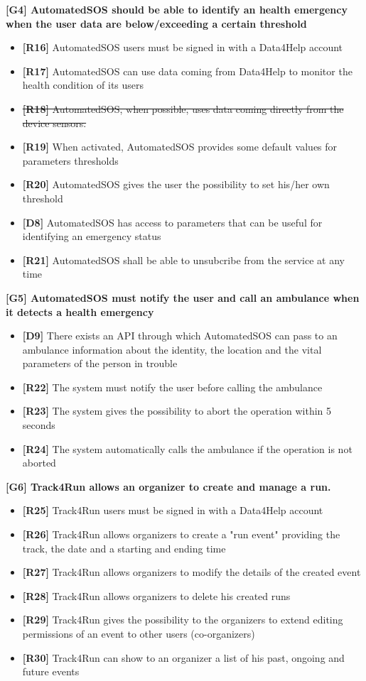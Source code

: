 \textbf{[G4] AutomatedSOS should be able to identify an health emergency when the user data are below/exceeding a certain threshold}
\begin{itemize}
	\item \textbf{[R16]} AutomatedSOS users must be signed in with a Data4Help account
	\item \textbf{[R17]} AutomatedSOS can use data coming from Data4Help to monitor the health condition of its users
	\item \sout{\textbf{[R18]} AutomatedSOS, when possible, uses data coming directly from the device sensors.}
	\item \textbf{[R19]} When activated, AutomatedSOS provides some default values for parameters thresholds
	\item \textbf{[R20]} AutomatedSOS gives the user the possibility to set his/her own threshold 
	\item \textbf{[D8]} AutomatedSOS has access to parameters that can be useful for identifying an emergency status
	\item \textbf{[R21]} AutomatedSOS shall be able to unsubcribe from the service at any time
\end{itemize}

\textbf{[G5] AutomatedSOS must notify the user and call an ambulance when it detects a health emergency}
\begin{itemize}
	\item \textbf{[D9]} There exists an API through which AutomatedSOS can pass to an ambulance information about the identity, the location and the vital parameters of the person in trouble
	\item \textbf{[R22]} The system must notify the user before calling the ambulance
	\item \textbf{[R23]} The system gives the possibility to abort the operation within 5 seconds
	\item \textbf{[R24]} The system automatically calls the ambulance if the operation is not aborted
\end{itemize}

\textbf{[G6] Track4Run allows an organizer to create and manage a run.}
\begin{itemize}
	\item \textbf{[R25]} Track4Run users must be signed in with a Data4Help account
	\item \textbf{[R26]} Track4Run allows organizers to create a "run event" providing the track, the date and a starting and ending time
	\item \textbf{[R27]}  Track4Run allows organizers to modify the details of the created event
	\item \textbf{[R28]} Track4Run allows organizers to delete his created runs
	\item \textbf{[R29]} Track4Run gives the possibility to the organizers to extend editing permissions of an event to other users (co-organizers) 
	\item \textbf{[R30]} Track4Run can show to an organizer a list of his past, ongoing and future events
\end{itemize}

